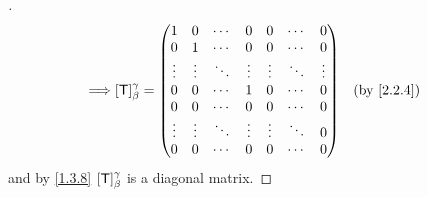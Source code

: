 \begin{proof}[]
\begin{align*}
    \implies & [\T]_{\beta}^{\gamma} = \begin{pmatrix}
                                         1      & 0      & \cdots & 0      & 0      & \cdots & 0      \\
                                         0      & 1      & \cdots & 0      & 0      & \cdots & 0      \\
                                         \vdots & \vdots & \ddots & \vdots & \vdots & \ddots & \vdots \\
                                         0      & 0      & \cdots & 1      & 0      & \cdots & 0      \\
                                         0      & 0      & \cdots & 0      & 0      & \cdots & 0      \\
                                         \vdots & \vdots & \ddots & \vdots & \vdots & \ddots & 0      \\
                                         0      & 0      & \cdots & 0      & 0      & \cdots & 0
                                       \end{pmatrix} &  & \by{2.2.4}
  \end{align*}
  and by \cref{1.3.8} \([\mathsf{T}]_{\beta}^{\gamma}\) is a diagonal matrix.
\end{proof}
